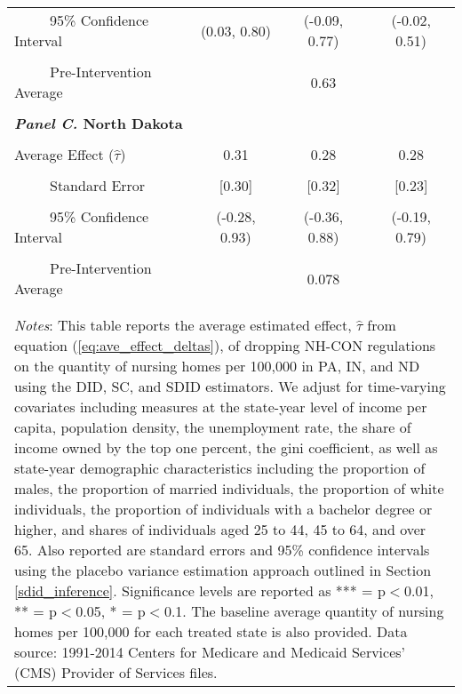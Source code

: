 \documentclass[12pt]{article}
\begin{document}
\begin{table}[htbp]
\begin{tabular}{l*{3}{c}}
\\[-2ex]
\multicolumn{1}{l}{\ \ \ \ \ 95\% Confidence Interval}&   \multicolumn{1}{c}{(0.03, 0.80)}&   \multicolumn{1}{c}{(-0.09, 0.77)}&   \multicolumn{1}{c}{(-0.02, 0.51)}\\
\\[-2ex]
\multicolumn{1}{l}{\ \ \ \ \ Pre-Intervention Average}&   \multicolumn{3}{c}{0.63}\\
\\[-.1ex]
\multicolumn{4}{l}{\textbf{\textit{Panel C.} North Dakota}}\\
\\[-1.5ex]
\multicolumn{1}{l}{Average Effect ($\hat{\tau}$)}&   \multicolumn{1}{c}{0.31}&   \multicolumn{1}{c}{0.28}&  \multicolumn{1}{c}{0.28}\\
\\[-2ex]
\multicolumn{1}{l}{\ \ \ \ \ Standard Error}  &\multicolumn{1}{c}{[0.30]}&\multicolumn{1}{c}{[0.32]}&\multicolumn{1}{c}{[0.23]}\\
\\[-2ex]
\multicolumn{1}{l}{\ \ \ \ \ 95\% Confidence Interval}&   \multicolumn{1}{c}{(-0.28, 0.93)}&   \multicolumn{1}{c}{(-0.36, 0.88)}&   \multicolumn{1}{c}{(-0.19, 0.79)}\\
\\[-2ex]
\multicolumn{1}{l}{\ \ \ \ \ Pre-Intervention Average}&   \multicolumn{3}{c}{0.078}\\
\\[-.1ex]
\hline\hline
\\[-2ex]
\multicolumn{4}{p{.69\linewidth}}{\footnotesize \textit{Notes}: This table reports the average estimated effect, $\hat{\tau}$ from equation (\ref{eq:ave_effect_deltas}), of dropping NH-CON regulations on the quantity of nursing homes per 100,000 in PA, IN, and ND using the DID, SC, and SDID estimators. We adjust for time-varying covariates including measures at the state-year level of income per capita, population density, the unemployment rate, the share of income owned by the top one percent, the gini coefficient, as well as state-year demographic characteristics including the proportion of males, the proportion of married individuals, the proportion of white individuals, the proportion of individuals with a bachelor degree or higher, and shares of individuals aged 25 to 44, 45 to 64, and over 65. Also reported are standard errors and 95\% confidence intervals using the placebo variance estimation approach outlined in Section \ref{sdid_inference}. Significance levels are reported as *** = p$<$0.01, ** = p$<$0.05, * = p$<$0.1. The baseline average quantity of nursing homes per 100,000 for each treated state is also provided. Data source: 1991-2014 Centers for Medicare and Medicaid Services’ (CMS) Provider of Services files.}
\end{tabular}
\end{table}
\vfill
\end{document}
